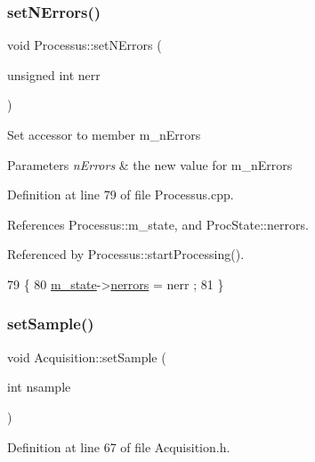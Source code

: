 \subsubsection{\texorpdfstring{set\+N\+Errors()}{setNErrors()}}
{\footnotesize\ttfamily void Processus\+::set\+N\+Errors (\begin{DoxyParamCaption}\item[{unsigned int}]{nerr }\end{DoxyParamCaption})\hspace{0.3cm}{\ttfamily [inherited]}}

Set accessor to member m\+\_\+n\+Errors 
\begin{DoxyParams}{Parameters}
{\em n\+Errors} & the new value for m\+\_\+n\+Errors \\
\hline
\end{DoxyParams}


Definition at line 79 of file Processus.\+cpp.



References Processus\+::m\+\_\+state, and Proc\+State\+::nerrors.



Referenced by Processus\+::start\+Processing().


\begin{DoxyCode}
79                                              \{
80   \hyperlink{classProcessus_ab3539eee42891ceae0baf4395ae7fb61}{m\_state}->\hyperlink{structProcState_a51a0f54ba62b07e07ac8518c5f32828d}{nerrors} = nerr ;
81 \}
\end{DoxyCode}
\mbox{\label{classAcquisition_ade6fd6483b3e3737fe7dcdffb5065954}} 
\subsubsection{\texorpdfstring{set\+Sample()}{setSample()}\hspace{0.1cm}{\footnotesize\ttfamily [1/2]}}
{\footnotesize\ttfamily void Acquisition\+::set\+Sample (\begin{DoxyParamCaption}\item[{int}]{nsample }\end{DoxyParamCaption})\hspace{0.3cm}{\ttfamily [inline]}}



Definition at line 67 of file Acquisition.\+h.



